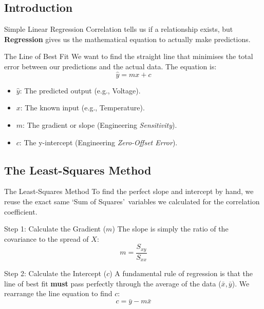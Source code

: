 \subsection{Introduction}
\begin{frame}{Simple Linear Regression}
    Correlation tells us if a relationship exists, but \textbf{Regression} gives us the mathematical equation to actually make predictions.
    
    \begin{block}{The Line of Best Fit}
        We want to find the straight line that minimises the total error between our predictions and the actual data. The equation is:
        $$\hat{y} = mx + c$$
        \begin{itemize}
            \item \textbf{$\hat{y}$}: The predicted output (e.g., Voltage).
            \item \textbf{$x$}: The known input (e.g., Temperature).
            \item \textbf{$m$}: The gradient or slope (Engineering \textit{Sensitivity}).
            \item \textbf{$c$}: The y-intercept (Engineering \textit{Zero-Offset Error}).
        \end{itemize}
    \end{block}
\end{frame}

\subsection{The Least-Squares Method}
\begin{frame}{The Least-Squares Method}
    To find the perfect slope and intercept by hand, we reuse the exact same \lq Sum of Squares\rq\ variables we calculated for the correlation coefficient.
    
    \begin{block}{Step 1: Calculate the Gradient ($m$)}
        The slope is simply the ratio of the covariance to the spread of $X$:
        $$m = \frac{S_{xy}}{S_{xx}}$$
    \end{block}
    
    \begin{block}{Step 2: Calculate the Intercept ($c$)}
        A fundamental rule of regression is that the line of best fit \textbf{must} pass perfectly through the average of the data ($\bar{x}, \bar{y}$). We rearrange the line equation to find $c$:
        $$c = \bar{y} - m\bar{x}$$
    \end{block}
\end{frame}

